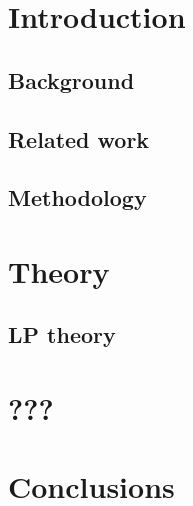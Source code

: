 \documentclass[paper=A4,DIV=calc]{scrbook}
\begin{document}
	\frontmatter
	\makefrontmatter

	\cleardoublepage
	\tableofcontents
	
	\mainmatter
	\chapter{Introduction}
	\section{Background}
	\section{Related work}
	\section{Methodology}

	\chapter{Theory}
	\section{LP theory}
	

	\chapter{???}

	\chapter{Conclusions}

	\nocite{*}
	\printbibliography[heading=bibintoc]
	\printglossary[type=\acronymtype,]
	\backmatter
\end{document}
